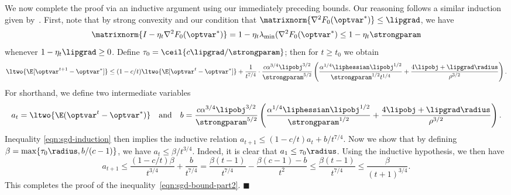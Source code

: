 \documentclass[11pt,twoside]{article}
\newcommand{\qed}{\hspace{\stretch{1}}
  $\blacksquare$
}
\theoremstyle{definition}
\begin{document}
We now complete the proof via an inductive argument using our immediately
preceding bounds. Our reasoning follows a similar induction given
by~\citet{RakhlinShSr12}.
First, note that by strong convexity and
our condition that $\matrixnorm{\nabla^2 F_0(\optvar^*)} \le \lipgrad$, we
have
\begin{equation*}
  \matrixnorm{I - \eta_t \nabla^2 F_0(\optvar^*)}
  = 1 - \eta_t \lambda_{\min}(\nabla^2 F_0(\optvar^*)
  \le 1 - \eta_t \strongparam
\end{equation*}
whenever $1 - \eta_t \lipgrad \ge 0$. Define $\tau_0 = \ceil{c \lipgrad /
  \strongparam}$; then for $t \ge t_0$ we obtain
\begin{equation}
  \label{eqn:sgd-induction}
  \ltwo{\E[\optvar^{t+1}-\optvar^*]}
  \le (1-c/t)\ltwo{\E[\optvar^t-\optvar^*]}
  + \frac{1}{t^{7/4}} \cdot
  \frac{c \alpha^{3/4} \lipobj^{3/2}}{\strongparam^{5/2}}
  \left(\frac{\alpha^{1/4}\liphessian \lipobj^{1/2}}{\strongparam^{1/2}
    t^{1/4}}
  + \frac{4 \lipobj + \lipgrad \radius}{\rho^{3/2}}\right).
\end{equation}
For shorthand, we define two intermediate variables
\begin{align*}
  a_{t}= \ltwo{\E(\optvar^{t}-\optvar^*)}
  ~~~\mbox{and}~~~
  b = \frac{c \alpha^{3/4} \lipobj^{3/2}}{\strongparam^{5/2}}
  \left(\frac{\alpha^{1/4}\liphessian \lipobj^{1/2}}{\strongparam^{1/2}}
  + \frac{4 \lipobj + \lipgrad \radius}{\rho^{3/2}}\right).
\end{align*}
Inequality \eqref{eqn:sgd-induction} then implies the inductive
relation $a_{t+1}\leq (1-c/t)a_t + b/t^{7/4}$. Now we show that
by defining $\beta = \max\{\tau_0 \radius, b / (c - 1)\}$, we have
$a_t \le \beta / t^{3/4}$. Indeed, it is clear that $a_1 \le \tau_0 \radius$.
Using the inductive hypothesis, we then have
\begin{equation*}
  a_{t+1} \le
  \frac{(1 - c/t) \beta}{t^{3/4}}
  + \frac{b}{t^{7/4}}
  = \frac{\beta(t - 1)}{t^{7/4}} - \frac{\beta(c - 1) - b}{t^2}
  \le \frac{\beta(t - 1)}{t^{7/4}}
  \le \frac{\beta}{(t + 1)^{3/4}}.
\end{equation*}
This completes the proof of the inequality~\eqref{eqn:sgd-bound-part2}.
\qed
\end{document}
